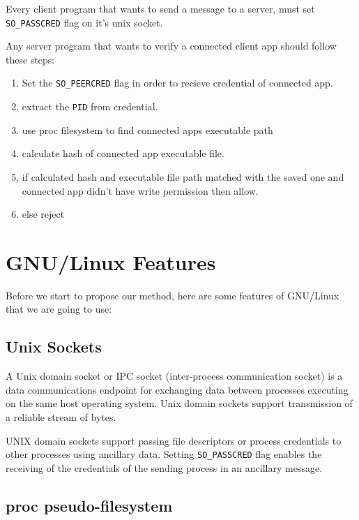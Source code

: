 \documentclass[journal]{IEEEtran}
\begin{document}
Every client program that wants to send a message to a server, must set \texttt{SO\_PASSCRED} flag on it's unix socket.

Any server program that wants to verify a connected client app should follow these steps:

\begin{enumerate}

\item Set the \texttt{SO\_PEERCRED} flag in order to recieve credential of connected app.
\item extract the \texttt{PID} from credential.
\item use proc filesystem to find connected apps executable path
\item calculate hash of connected app executable file.
\item if calculated hash and executable file path matched with the saved one and connected app didn't have write permission then allow.
\item else reject

\end{enumerate}



\section{GNU/Linux Features}

Before we start to propose our method, here are some features of GNU/Linux that we are going to use:

\subsection{Unix Sockets}

A Unix domain socket or IPC socket (inter-process communication socket) is a data communications endpoint for exchanging data between processes executing on the same host operating system. Unix domain sockets support transmission of a reliable stream of bytes. \cite{wiki:unixsock}

UNIX domain sockets support passing file descriptors or process credentials to other processes using ancillary data. Setting \texttt{SO\_PASSCRED} flag enables the receiving of the credentials of the sending process in an ancillary message. \cite{linuxman:unix}

\subsection{proc pseudo-filesystem}
\end{document}
